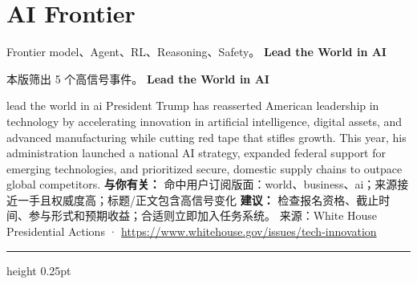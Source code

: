 \documentclass[10.5pt]{ctexart}
\begin{document}
\section*{AI Frontier}
{\color{ormuted} Frontier model、Agent、RL、Reasoning、Safety。}
\vspace{2mm}
{\LARGE\bfseries Lead the World in AI}\par
\vspace{1mm}
{\color{ormuted} 本版筛出 5 个高信号事件。}
\vspace{3mm}
{\Large\bfseries Lead the World in AI}\par
lead the world in ai President Trump has reasserted American leadership in technology by accelerating innovation in artificial intelligence, digital assets, and advanced manufacturing while cutting red tape that stifles growth. This year, his administration launched a national AI strategy, expanded federal support for emerging technologies, and prioritized secure, domestic supply chains to outpace global competitors.
\textbf{与你有关：} 命中用户订阅版面：world、business、ai；来源接近一手且权威度高；标题/正文包含高信号变化
\textbf{建议：} 检查报名资格、截止时间、参与形式和预期收益；合适则立即加入任务系统。
{\footnotesize\color{ormuted} 来源：White House Presidential Actions · \url{https://www.whitehouse.gov/issues/tech-innovation}}
\vspace{4mm}
\hrule height 0.25pt
\vspace{3mm}
\end{document}
